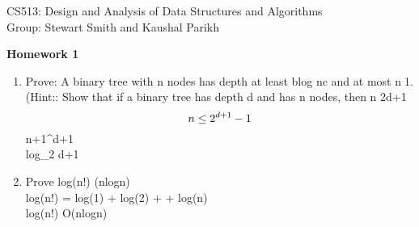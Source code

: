 \documentclass[11pt]{article}
\begin{document}
\sloppy

\noindent CS513: Design and Analysis of Data Structures and Algorithms \\
Group: Stewart Smith and Kaushal Parikh\\

\begin{center}
    \LARGE{\textbf{Homework 1}}\\
\end{center}

\vspace{.1in}

\begin{enumerate}

\item Prove: A binary tree with n nodes has depth at least blog nc and at most n􀀀1. (Hint:: Show that if a binary tree has depth d and has n nodes, then n  2d+1 􀀀 \\
    $$n\leq 2^{d+1}-1\\
    $$n+1^{d+1}\\
    log_2 \leq d+1\\

\item Prove log(n!) \in \Theta({nlogn})\\
    log(n!) = log(1) + log(2) + \cdots + log(n) \\
    log(n!) \in O(nlogn)\\


\end{enumerate}
\end{document}
